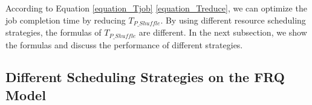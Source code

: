 {{According to Equation \ref{equation_Tjob}  \ref{equation_Treduce}, we can optimize the job completion time by reducing \(T_{P\_Shuffle}\).
By using different resource scheduling strategies, the formulas of \(T_{P\_Shuffle}\) are different.
In the next subsection, we show the formulas and discuss the performance of different strategies.
}	

\subsection{Different Scheduling Strategies on the FRQ Model}\label{model_analysis}



}

